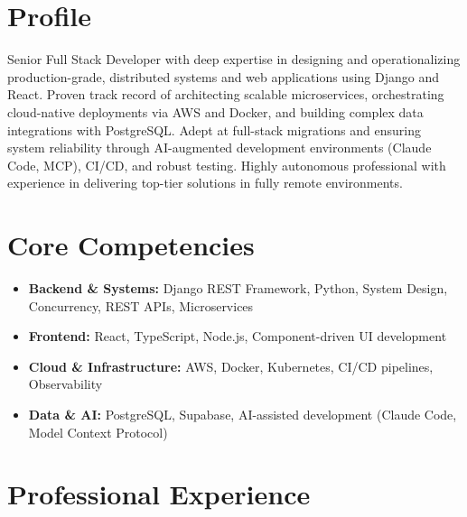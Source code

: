 \documentclass[11pt,a4paper,sans]{moderncv}
\begin{document}
\makecvtitle

\section{Profile}
Senior Full Stack Developer with deep expertise in designing and operationalizing production-grade, distributed systems and web applications using Django and React. Proven track record of architecting scalable microservices, orchestrating cloud-native deployments via AWS and Docker, and building complex data integrations with PostgreSQL. Adept at full-stack migrations and ensuring system reliability through AI-augmented development environments (Claude Code, MCP), CI/CD, and robust testing. Highly autonomous professional with experience in delivering top-tier solutions in fully remote environments.

\section{Core Competencies}
\begin{itemize}
\item \textbf{Backend \& Systems:} Django REST Framework, Python, System Design, Concurrency, REST APIs, Microservices
\item \textbf{Frontend:} React, TypeScript, Node.js, Component-driven UI development
\item \textbf{Cloud \& Infrastructure:} AWS, Docker, Kubernetes, CI/CD pipelines, Observability
\item \textbf{Data \& AI:} PostgreSQL, Supabase, AI-assisted development (Claude Code, Model Context Protocol)
\end{itemize}

\section{Professional Experience}

\end{document}
